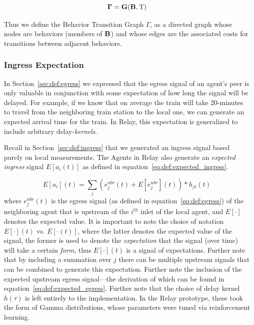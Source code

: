 \documentclass{report}
\newcommand{\Tau}{\mathrm{T}}
\begin{document}
\begin{equation}\label{eq:def:btg}
	\bf{\Gamma} = G(\bf{B}, \Tau)
\end{equation}

Thus we define the Behavior Transition Graph $\Gamma$, as a directed graph whose nodes are behaviors (members of $\bf{B}$) and whose edges are the associated costs for transitions between adjacent behaviors.


\subsubsection{Ingress Expectation}
\label{sec:def:expected_ingress}

In Section~\ref{sec:def:egress} we expressed that the egress signal of an agent's peer is only valuable in conjunction with some expectation of how long the signal will be delayed.
For example, if we know that on average the train will take 20-minutes to travel from the neighboring train station to the local one, we can  generate an expected arrival time for the train.
In Relay, this expectation is generalized to include arbitrary delay-\emph{kernels}.

Recall in Section~\ref{sec:def:ingress} that we generated an ingress signal based purely on local measurements.
The Agents in Relay also generate an \emph{expected ingress} signal $E\left[a_i(t)\right]$ as defined in equation~\eqref{eq:def:expected_ingress}.

\begin{equation}\label{eq:def:expected_ingress}
	E\left[a_i\right](t) = \sum_{j} \left(e_j^{nbr}(t) + E\left[e_j^{nbr}\right](t) \right) * h_{ji}(t)
\end{equation}
where $e_j^{nbr}(t)$ is the egress signal (as defined in equation~\eqref{eq:def:egress}) of the neighboring agent that is upstream of the $i^{th}$ inlet of the local agent, and $E\left[ \cdot \right]$ denotes the expected value.
It is important to note the choice of notation $E[\cdot](t)$ vs. $E[\cdot(t)]$, where the latter denotes the expected value of the signal, the former is used to denote the \emph{expectation} that the signal (over time) will take a certain \emph{form}, thus $E[\cdot](t)$ is a signal of expectations.
Further note that by including a summation over $j$ there can be multiple upstream signals that can be combined to generate this expectation.
Further note the inclusion of the expected upstream egress signal---the derivation of which can be found in equation~\eqref{eq:def:expected_egress}.
Further note that the choice of delay kernel $h(\tau)$ is left entirely to the implementation.
In the Relay prototype, these took the form of Gamma distributions, whose parameters were tuned via reinforcement learning.
\end{document}
